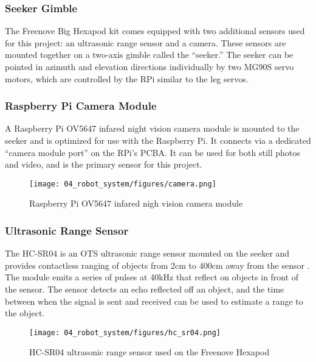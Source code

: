 \subsubsection{ Seeker Gimble }

The Freenove Big Hexapod kit comes equipped with two additional sensors used for this project: an ultrasonic range sensor and a camera. These sensors are mounted together on a two-axis gimble called the ``seeker.'' The seeker can be pointed in azimuth and elevation directions individually by two MG90S servo motors, which are controlled by the RPi similar to the leg servos.

\subsubsection{ Raspberry Pi Camera Module}

A Raspberry Pi OV5647 infared night vision camera module is mounted to the seeker and is optimized for use with the Raspberry Pi.  It connects via a dedicated ``camera module port'' on the RPi's PCBA. It can be used for both still photos and video, and is the primary sensor for this project.

\begin{figure}[h]
    \centering
    \texttt{[image: 04\_robot\_system/figures/camera.png]}
    \caption{Raspberry Pi OV5647 infared nigh vision camera module}
    \label{fig:raspberry_pi_cam}
\end{figure}

\subsubsection{ Ultrasonic Range Sensor }
The HC-SR04 is an OTS ultrasonic range sensor mounted on the seeker and provides contactless ranging of objects from 2cm to 400cm away from the sensor \cite{hcsr04}.  The module emits a series of pulses at 40kHz that reflect on objects in front of the sensor. The sensor detects an echo reflected off an object, and the time between when the signal is sent and received can be used to estimate a range to the object. 

\begin{figure}[h]
    \centerline{\texttt{[image: 04\_robot\_system/figures/hc\_sr04.png]}}
    \caption{HC-SR04 ultrasonic range sensor used on the Freenove Hexapod}
    \label{fig:HC-SR04}
\end{figure}

